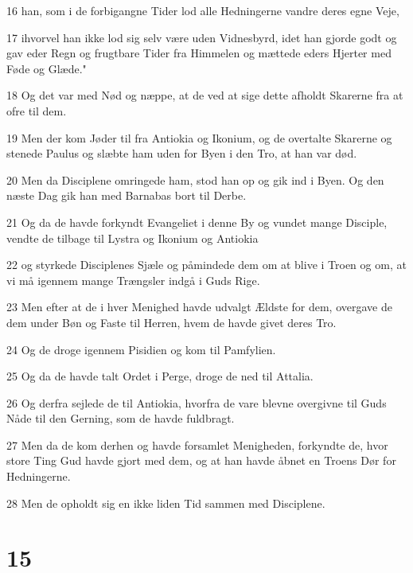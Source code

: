 \par 16 han, som i de forbigangne Tider lod alle Hedningerne vandre deres egne Veje,
\par 17 ihvorvel han ikke lod sig selv være uden Vidnesbyrd, idet han gjorde godt og gav eder Regn og frugtbare Tider fra Himmelen og mættede eders Hjerter med Føde og Glæde."
\par 18 Og det var med Nød og næppe, at de ved at sige dette afholdt Skarerne fra at ofre til dem.
\par 19 Men der kom Jøder til fra Antiokia og Ikonium, og de overtalte Skarerne og stenede Paulus og slæbte ham uden for Byen i den Tro, at han var død.
\par 20 Men da Disciplene omringede ham, stod han op og gik ind i Byen. Og den næste Dag gik han med Barnabas bort til Derbe.
\par 21 Og da de havde forkyndt Evangeliet i denne By og vundet mange Disciple, vendte de tilbage til Lystra og Ikonium og Antiokia
\par 22 og styrkede Disciplenes Sjæle og påmindede dem om at blive i Troen og om, at vi må igennem mange Trængsler indgå i Guds Rige.
\par 23 Men efter at de i hver Menighed havde udvalgt Ældste for dem, overgave de dem under Bøn og Faste til Herren, hvem de havde givet deres Tro.
\par 24 Og de droge igennem Pisidien og kom til Pamfylien.
\par 25 Og da de havde talt Ordet i Perge, droge de ned til Attalia.
\par 26 Og derfra sejlede de til Antiokia, hvorfra de vare blevne overgivne til Guds Nåde til den Gerning, som de havde fuldbragt.
\par 27 Men da de kom derhen og havde forsamlet Menigheden, forkyndte de, hvor store Ting Gud havde gjort med dem, og at han havde åbnet en Troens Dør for Hedningerne.
\par 28 Men de opholdt sig en ikke liden Tid sammen med Disciplene.

\chapter{15}

